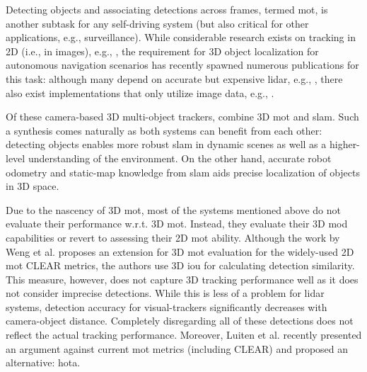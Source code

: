 \documentclass[headsepline, hidelinks, footsepline, footinclude=false, oneside, fontsize=11pt, paper=a4, listof=totoc, bibliography=totoc]{scrbook}
\begin{document}
Detecting objects and associating detections across frames, termed \gls{mot}, is another subtask for any self-driving system (but also critical for other applications, e.g., surveillance).
While considerable research exists on tracking in 2D (i.e., in images), e.g., \cite{leal-taixeEverybodyNeedsSomebody2011,sharmaPixelsLeveragingGeometry2018,schulterDeepNetworkFlow2017,lizhangGlobalDataAssociation2008}, the requirement for 3D object localization for autonomous navigation scenarios has recently spawned numerous publications for this task:
although many depend on accurate but expensive \gls{lidar}, e.g., \cite{wengBaseline3DMultiObject2019,baserFANTrack3DMultiObject2019,yinCenterbased3DObject2021,chiuProbabilistic3DMultiObject2020}, 
there also exist implementations that only utilize image data, e.g., \cite{osepCombinedImageWorldSpace2018,luitenTrackReconstructReconstruct2020,liStereoVisionbasedSemantic2018,heneinDynamicSLAMNeed2020,barsanRobustDenseMapping2018,yangCubeSLAMMonocular3D2019,dongVisualInertialSemanticSceneRepresentation2017}.


Of these camera-based 3D multi-object trackers, \cite{liStereoVisionbasedSemantic2018,heneinDynamicSLAMNeed2020,barsanRobustDenseMapping2018,yangCubeSLAMMonocular3D2019,dongVisualInertialSemanticSceneRepresentation2017,luitenTrackReconstructReconstruct2020} combine 3D \gls{mot} and \gls{slam}. 
Such a synthesis comes naturally as both systems can benefit from each other: 
detecting objects enables more robust \gls{slam} in dynamic scenes as well as a higher-level understanding of the environment.
On the other hand, accurate robot odometry and static-map knowledge from \gls{slam} aids precise localization of objects in 3D space.


Due to the nascency of 3D \gls{mot}, most of the systems mentioned above do not evaluate their performance w.r.t. 3D \gls{mot}. 
Instead, they evaluate their 3D \gls{mod} capabilities or revert to assessing their 2D \gls{mot} ability. 
Although the work by Weng et al. \cite{wengBaseline3DMultiObject2019} proposes an extension for 3D \gls{mot} evaluation for the widely-used 2D \gls{mot} CLEAR \cite{bernardinEvaluatingMultipleObject2008} metrics, the authors use 3D \gls{iou} for calculating detection similarity.
This measure, however, does not capture 3D tracking performance well as it does not consider imprecise detections. 
While this is less of a problem for \gls{lidar} systems, detection accuracy for visual-trackers significantly decreases with camera-object distance.
Completely disregarding all of these detections does not reflect the actual tracking performance. 
Moreover, Luiten et al. \cite{luitenHOTAHigherOrder2021} recently presented an argument against current \gls{mot} metrics (including CLEAR) and proposed an alternative: \gls{hota}.
\end{document}
